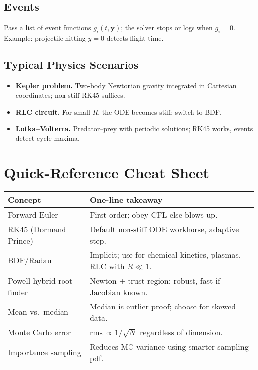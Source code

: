 \documentclass[a4paper,11pt]{article}
\begin{document}
\subsection{Events}
Pass a list of event functions $g_i(t,\mathbf y)$; the solver stops or logs when $g_i=0$.  
Example: projectile hitting $y=0$ detects flight time.

\subsection{Typical Physics Scenarios}
\begin{itemize}
  \item \textbf{Kepler problem.} Two-body Newtonian gravity integrated in Cartesian coordinates; non-stiff RK45 suffices.
  \item \textbf{RLC circuit.} For small $R$, the ODE becomes stiff; switch to BDF.
  \item \textbf{Lotka–Volterra.} Predator–prey with periodic solutions; RK45 works, events detect cycle maxima.
\end{itemize}

\section*{Quick-Reference Cheat Sheet}

\begin{center}
\begin{tabular}{@{}ll@{}}
\toprule
\textbf{Concept} & \textbf{One-line takeaway}\\
\midrule
Forward Euler & First-order; obey CFL else blows up.\\
RK45 (Dormand–Prince) & Default non-stiff ODE workhorse, adaptive step.\\
BDF/Radau & Implicit; use for chemical kinetics, plasmas, RLC with $R\!\ll\!1$.\\
Powell hybrid root-finder & Newton + trust region; robust, fast if Jacobian known.\\
Mean vs.\ median & Median is outlier-proof; choose for skewed data.\\
Monte Carlo error & rms\,$\propto 1/\sqrt{N}$ regardless of dimension.\\
Importance sampling & Reduces MC variance using smarter sampling pdf.\\
\bottomrule
\end{tabular}
\end{center}

\end{document}
